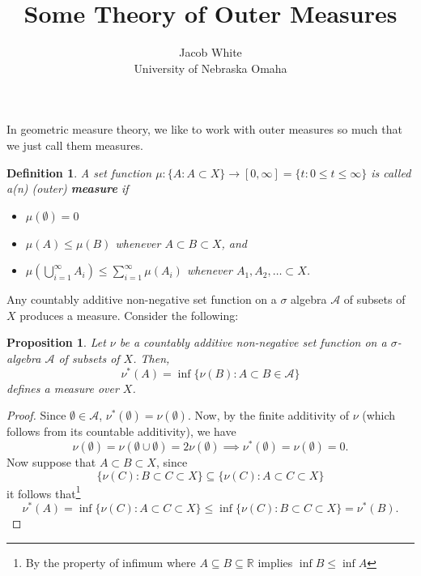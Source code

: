 \documentclass[10pt]{article}
\title{\textbf{Some Theory of Outer Measures}}
\date{}
\author{Jacob White \\ University of Nebraska Omaha}
\theoremstyle{plain}
\newtheorem{definition}{Definition}
\newtheorem{proposition}{Proposition}
\begin{document}
	\maketitle 
	
In geometric measure theory, we like to work with outer measures so much that we just call them measures. 
	\begin{definition}
		A set function $\mu: \{A : A \subset X\} \to [0, \infty] = \{t : 0 \leq t \leq \infty\}$ is called a(n) (outer) \textbf{\textit{measure}} if
			\begin{itemize}
				\item[(1)] $\mu(\emptyset) = 0$
				
				\item[(2)] $\mu(A) \leq \mu(B)$ whenever $A \subset B \subset X$, and
				
				\item[(3)] $\displaystyle{\mu\left(\bigcup_{i = 1}^\infty A_i\right) \leq \sum_{i = 1}^\infty \mu(A_i)}$ whenever $A_1, A_2, \dots \subset X$.  
			\end{itemize}
	\end{definition}
	
Any countably additive non-negative set function on a $\sigma$ algebra $\mathcal{A}$ of subsets of $X$ produces a measure. Consider the following:
	
	\begin{proposition}
		Let $\nu$ be a countably additive non-negative set function on a $\sigma$-algebra $\mathcal{A}$ of subsets of $X$. Then, \begin{equation}\nu^\ast(A) = \inf \{\nu(B) : A \subset B \in \mathcal{A}\}\end{equation} defines a measure over $X$. 
	\end{proposition} 
		\begin{proof}
			Since $\emptyset \in \mathcal{A}$, $\nu^\ast(\emptyset) = \nu(\emptyset)$. Now, by the finite additivity of $\nu$ (which follows from its countable additivity), we have $$\nu(\emptyset) = \nu(\emptyset \cup \emptyset) = 2 \nu(\emptyset) \implies \nu^\ast(\emptyset) = \nu(\emptyset) = 0.$$ Now suppose that $A \subset B \subset X$, since $$\{\nu(C) : B \subset C \subset X\} \subseteq \{\nu(C) : A \subset C \subset X\}$$ it follows that\footnote{By the property of infimum where $A \subseteq B \subseteq \mathbb{R}$ implies $\inf B \leq \inf A$} $$\nu^\ast(A) = \inf \{\nu(C) : A \subset C \subset X\} \leq \inf \{\nu(C) : B \subset C \subset X\} = \nu^\ast(B).$$ 
		\end{proof}
	
\end{document}
